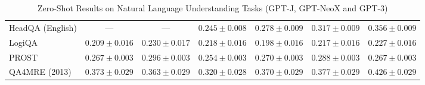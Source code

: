 \documentclass[11pt]{article}
\begin{document}
{\begin{landscape}
\begin{table}
\begin{tabular}{l c c c c c c }
HeadQA (English) & --- & --- & $0.245 \pm 0.008$ & $0.278 \pm 0.009$ & $0.317 \pm 0.009$ & $0.356 \pm 0.009$ \\ 
LogiQA & $0.209 \pm 0.016$ & $0.230 \pm 0.017$ & $0.218 \pm 0.016$ & $0.198 \pm 0.016$ & $0.217 \pm 0.016$ & $0.227 \pm 0.016$ \\ 
PROST & $0.267 \pm 0.003$ & $0.296 \pm 0.003$ & $0.254 \pm 0.003$ & $0.270 \pm 0.003$ & $0.288 \pm 0.003$ & $0.267 \pm 0.003$ \\ 
QA4MRE (2013) & $0.373 \pm 0.029$ & $0.363 \pm 0.029$ & $0.320 \pm 0.028$ & $0.370 \pm 0.029$ & $0.377 \pm 0.029$ & $0.426 \pm 0.029$ \\ \bottomrule
\end{tabular}
\caption{Zero-Shot Results on Natural Language Understanding Tasks (GPT-J, GPT-NeoX and GPT-3)}
\label{tab:nlu_gpt}
\end{table}


\end{landscape}}
\end{document}
